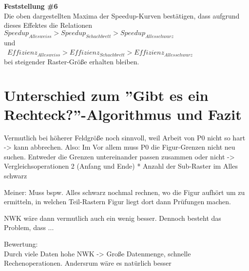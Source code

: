 \documentclass[
10pt, %
a4paper, %
oneside, %
headinclude,footinclude, %
BCOR5mm, %
]{scrartcl}
\begin{document}
\textbf{Feststellung \#6}\\
Die oben dargestellten Maxima der Speedup-Kurven bestätigen, dass aufgrund dieses Effektes die Relationen\\ 
\(Speedup_{Alles weiss} > Speedup_{Schachbrett} > Speedup_{Alles schwarz} \)\\
und\\\
\(Effizienz_{Alles weiss} > Effizienz_{Schachbrett} > Effizienz_{Alles schwarz} \)\\
bei steigender Raster-Größe erhalten bleiben.

\section{Unterschied zum ''Gibt es ein Rechteck?''-Algorithmus und Fazit}




Vermutlich bei höherer Feldgröße noch sinnvoll, weil Arbeit von P0 nicht so hart -> kann abbrechen.
Also: Im 
Vor allem muss P0 die Figur-Grenzen nicht neu suchen.
Entweder die Grenzen untereinander passen zusammen oder nicht -> Vergleichsoperationen 2 (Anfang und Ende) * Anzahl der Sub-Raster im Alles schwarz

Meiner: Muss bspw. Alles schwarz nochmal rechnen, wo die Figur aufhört um zu ermitteln, in welchen Teil-Rastern Figur liegt dort dann Prüfungen machen.

NWK wäre dann vermutlich auch ein wenig besser. Dennoch besteht das Problem, dass ...

Bewertung:\\
Durch viele Daten hohe NWK -> 
Große Datenmenge, schnelle Rechenoperationen.
Andersrum wäre es natürlich besser\\
\end{document}
